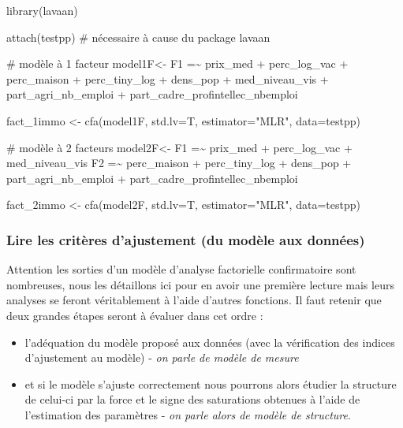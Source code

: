 \documentclass[
  french,
  11pt,
  a4paper,
]{article}
\newenvironment{Shaded}{}{}
\newcommand{\AttributeTok}[1]{\textcolor[rgb]{0.84,0.23,0.29}{#1}}
\newcommand{\CommentTok}[1]{\textcolor[rgb]{0.42,0.45,0.49}{#1}}
\newcommand{\FunctionTok}[1]{\textcolor[rgb]{0.44,0.26,0.76}{#1}}
\newcommand{\NormalTok}[1]{\textcolor[rgb]{0.14,0.16,0.18}{#1}}
\newcommand{\OtherTok}[1]{\textcolor[rgb]{0.44,0.26,0.76}{#1}}
\newcommand{\StringTok}[1]{\textcolor[rgb]{0.01,0.18,0.38}{#1}}
\providecommand{\tightlist}{%
  \setlength{\itemsep}{0pt}\setlength{\parskip}{0pt}}
\begin{document}
\begin{Shaded}
\begin{Highlighting}[]
\FunctionTok{library}\NormalTok{(lavaan)}

\FunctionTok{attach}\NormalTok{(testpp) }\CommentTok{\# nécessaire à cause du package lavaan}

\CommentTok{\# modèle à 1 facteur}
\NormalTok{model1F}\OtherTok{\textless{}{-}} \StringTok{\textquotesingle{}F1 =\textasciitilde{} prix\_med + perc\_log\_vac + perc\_maison + perc\_tiny\_log + dens\_pop + med\_niveau\_vis + part\_agri\_nb\_emploi + part\_cadre\_profintellec\_nbemploi\textquotesingle{}}

\NormalTok{fact\_1immo }\OtherTok{\textless{}{-}} \FunctionTok{cfa}\NormalTok{(model1F, }\AttributeTok{std.lv=}\NormalTok{T, }\AttributeTok{estimator=}\StringTok{"MLR"}\NormalTok{, }\AttributeTok{data=}\NormalTok{testpp)}

\CommentTok{\# modèle à 2 facteurs}
\NormalTok{model2F}\OtherTok{\textless{}{-}} \StringTok{\textquotesingle{}F1 =\textasciitilde{} prix\_med + perc\_log\_vac + med\_niveau\_vis}
\StringTok{           F2 =\textasciitilde{} perc\_maison + perc\_tiny\_log + dens\_pop + part\_agri\_nb\_emploi + part\_cadre\_profintellec\_nbemploi\textquotesingle{}}

\NormalTok{fact\_2immo }\OtherTok{\textless{}{-}} \FunctionTok{cfa}\NormalTok{(model2F, }\AttributeTok{std.lv=}\NormalTok{T, }\AttributeTok{estimator=}\StringTok{"MLR"}\NormalTok{, }\AttributeTok{data=}\NormalTok{testpp)}
\end{Highlighting}
\end{Shaded}

\subsubsection{Lire les critères d'ajustement (du modèle aux
données)}\label{lire-les-crituxe8res-dajustement-du-moduxe8le-aux-donnuxe9es}

Attention les sorties d'un modèle d'analyse factorielle confirmatoire
sont nombreuses, nous les détaillons ici pour en avoir une première
lecture mais leurs analyses se feront véritablement à l'aide d'autres
fonctions. Il faut retenir que deux grandes étapes seront à évaluer dans
cet ordre :

\begin{itemize}
\tightlist
\item
  l'adéquation du modèle proposé aux données (avec la vérification des
  indices d'ajustement au modèle) - \emph{on parle de modèle de mesure}
\item
  et si le modèle s'ajuste correctement nous pourrons alors étudier la
  structure de celui-ci par la force et le signe des saturations
  obtenues à l'aide de l'estimation des paramètres - \emph{on parle
  alors de modèle de structure}.
\end{itemize}
\end{document}
